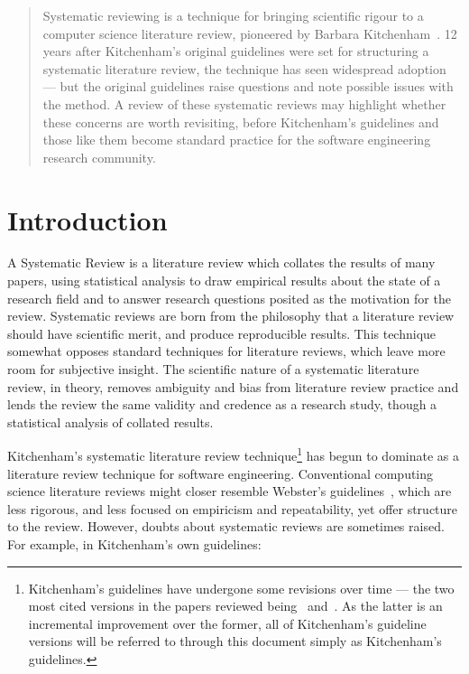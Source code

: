 

\maketitle

\begin{abstract}
Systematic reviewing is a technique for bringing scientific rigour to a computer science literature review, pioneered by Barbara Kitchenham~\citep{Kitchenham2004}. 12 years after Kitchenham's original guidelines were set for structuring a systematic literature review, the technique has seen widespread adoption --- but the original guidelines raise questions and note possible issues with the method. A review of these systematic reviews may highlight whether these concerns are worth revisiting, before Kitchenham's guidelines and those like them become standard practice for the software engineering research community.
\end{abstract}

\section{Introduction}
A Systematic Review is a literature review which collates the results of many papers, using statistical analysis to draw empirical results about the state of a research field and to answer research questions posited as the motivation for the review. Systematic reviews are born from the philosophy that a literature review should have scientific merit, and produce reproducible results. This technique somewhat opposes standard techniques for literature reviews, which leave more room for subjective insight. The scientific nature of a systematic literature review, in theory, removes ambiguity and bias from literature review practice and lends the review the same validity and credence as a research study, though a statistical analysis of collated results.\par

Kitchenham's systematic literature review technique\footnote{Kitchenham's guidelines have undergone some revisions over time --- the two most cited versions in the papers reviewed being~\cite{Kitchenham2004} and~\cite{Kitchenham2007}. As the latter is an incremental improvement over the former, all of Kitchenham's guideline versions will be referred to through this document simply as Kitchenham's guidelines.} has begun to dominate as a literature review technique for software engineering. Conventional computing science literature reviews might closer resemble Webster's guidelines~\citep{Webster2002}, which are less rigorous, and less focused on empiricism and repeatability, yet offer structure to the review. However, doubts about systematic reviews are sometimes raised. For example, in Kitchenham's own guidelines:

